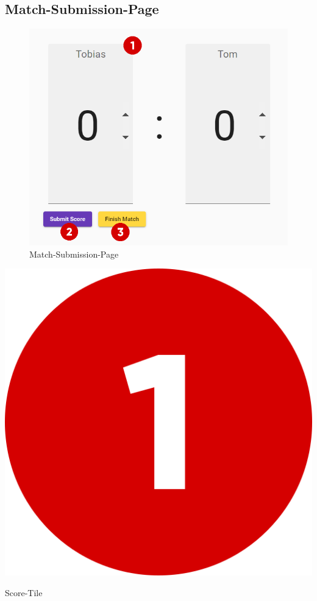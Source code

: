 \bigskip
\subsection{Match-Submission-Page}
\begin{figure}[H]
    \includegraphics[scale=0.6]{pics/user-guide/match-submition-page.PNG}
    \caption{Match-Submission-Page}
\end{figure}

\bigskip
\includegraphics[scale=0.05]{pics/user-guide/numbers/number-1.png} \begin{LARGE} Score-Tile \end{LARGE}

